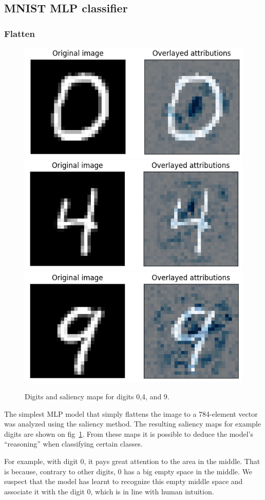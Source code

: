 \documentclass[journal, a4paper]{IEEEtran}
\begin{document}
\subsection{MNIST MLP classifier}\label{subsec:experiment-mnist-mlp}

\subsubsection{Flatten}

\begin{figure}[ht]\centering
    \includegraphics[width=.6\linewidth]{img/saliency_flat/0.png}
    \includegraphics[width=.6\linewidth]{img/saliency_flat/4.png}
    \includegraphics[width=.6\linewidth]{img/saliency_flat/9.png}
    \caption{Digits and saliency maps for digits 0,4, and 9.}\label{fig:flatten-attributions}
\end{figure}

The simplest MLP model that simply flattens the image to a 784-element vector was analyzed using the saliency method.
The resulting saliency maps for example digits are shown on fig~\ref{fig:flatten-attributions}.
From these maps it is possible to deduce the model's ``reasoning'' when classifying certain classes.

For example, with digit 0, it pays great attention to the area in the middle. That is because, contrary to other digits, 0 has a big empty space in the middle.
We suspect that the model has learnt to recognize this empty middle space and associate it with the digit 0, which is in line with human intuition.
\end{document}
